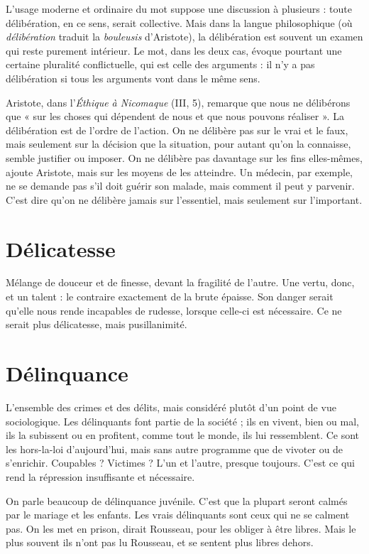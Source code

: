 L'usage moderne et ordinaire du mot suppose une discussion à plusieurs :
toute délibération, en ce sens, serait collective. Mais dans la langue philosophique
(où {\it délibération} traduit la {\it bouleusis} d’Aristote), la délibération est souvent
un examen qui reste purement intérieur. Le mot, dans les deux cas, évoque
pourtant une certaine pluralité conflictuelle, qui est celle des arguments : il n’y
a pas délibération si tous les arguments vont dans le même sens.

Aristote, dans l’{\it Éthique à Nicomaque} (III, 5), remarque que nous ne délibérons
que « sur les choses qui dépendent de nous et que nous pouvons réaliser ».
La délibération est de l’ordre de l’action. On ne délibère pas sur le vrai et le
faux, mais seulement sur la décision que la situation, pour autant qu’on la
connaisse, semble justifier ou imposer. On ne délibère pas davantage sur les fins
elles-mêmes, ajoute Aristote, mais sur les moyens de les atteindre. Un médecin,
par exemple, ne se demande pas s’il doit guérir son malade, mais comment il
peut y parvenir. C’est dire qu’on ne délibère jamais sur l’essentiel, mais seulement
sur l'important.

\section{Délicatesse}
Mélange de douceur et de finesse, devant la fragilité de l’autre.
Une vertu, donc, et un talent : le contraire exactement de
la brute épaisse. Son danger serait qu’elle nous rende incapables de rudesse,
lorsque celle-ci est nécessaire. Ce ne serait plus délicatesse, mais pusillanimité.

\section{Délinquance}
L'ensemble des crimes et des délits, mais considéré plutôt
d’un point de vue sociologique. Les délinquants font
partie de la société ; ils en vivent, bien ou mal, ils la subissent ou en profitent,
comme tout le monde, ils lui ressemblent. Ce sont les hors-la-loi d’aujourd’hui,
mais sans autre programme que de vivoter ou de s'enrichir. Coupables ?
Victimes ? L’un et l’autre, presque toujours. C’est ce qui rend la répression
insuffisante et nécessaire.

On parle beaucoup de délinquance juvénile. C’est que la plupart seront
calmés par le mariage et les enfants. Les vrais délinquants sont ceux qui ne se
calment pas. On les met en prison, dirait Rousseau, pour les obliger à être
libres. Mais le plus souvent ils n’ont pas lu Rousseau, et se sentent plus libres
dehors.

